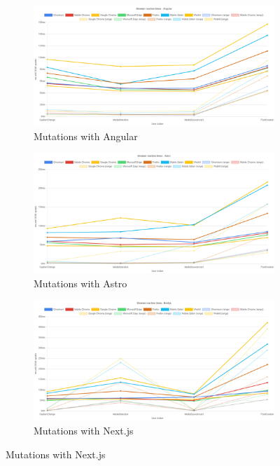 \documentclass[a4paper, 10pt]{article}
\begin{document}
\begin{figure}[ht!]
  \centering
  \begin{subfigure}{0.9\linewidth}
    \begin{center}
      \includegraphics[width=\linewidth, keepaspectratio]{img/playwright-results/framework/AngularAvg.png}
    \end{center}
    \caption{Mutations with Angular}\label{subfig:PW:AngularAvg}
  \end{subfigure}
  \begin{subfigure}{0.9\linewidth}
    \begin{center}
      \includegraphics[width=\linewidth, keepaspectratio]{img/playwright-results/framework/AstroAvg.png}
    \end{center}
    \caption{Mutations with Astro}\label{subfig:PW:AstroAvg}
  \end{subfigure}
  \begin{subfigure}{0.9\linewidth}
    \begin{center}
      \includegraphics[width=\linewidth, keepaspectratio]{img/playwright-results/framework/NextAvg.png}
    \end{center}
    \caption{Mutations with Next.js}\label{subfig:PW:NextAvg}
  \end{subfigure}
\end{figure}
\end{document}
